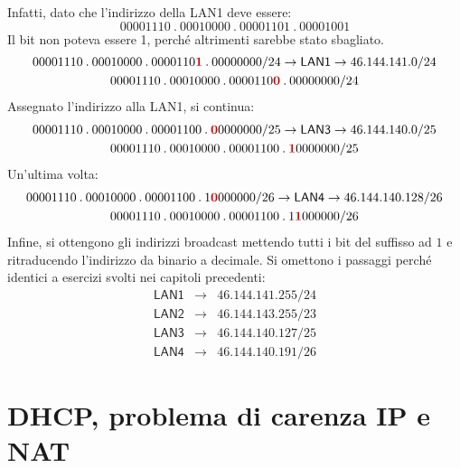 \documentclass[a4paper]{article}
\newcommand{\binaryaddresspointed}[4]{#1\:.\:#2\:.\:#3\:.\:#4}
\begin{document}
	Infatti, dato che l'indirizzo della \textsf{LAN1} deve essere:
	\begin{equation*}
		\binaryaddresspointed{00001110}{00010000}{00001101}{00001001}
	\end{equation*}
	Il bit non poteva essere 1, perché altrimenti sarebbe stato sbagliato.
	\begin{gather*}
		\binaryaddresspointed{00001110}{00010000}{0000110\textcolor{Red3}{\boldsymbol{1}}}{00000000}/24 \rightarrow \textsf{LAN1} \rightarrow 46.144.141.0/24 \\
		\binaryaddresspointed{00001110}{00010000}{0000110\textcolor{Red3}{\boldsymbol{0}}}{00000000}/24
	\end{gather*}
	Assegnato l'indirizzo alla \textsf{LAN1}, si continua:
	\begin{gather*}
		\binaryaddresspointed{00001110}{00010000}{00001100}{\textcolor{Red3}{\boldsymbol{0}}0000000}/25 \rightarrow \textsf{LAN3} \rightarrow 46.144.140.0/25 \\
		\binaryaddresspointed{00001110}{00010000}{00001100}{\textcolor{Red3}{\boldsymbol{1}}0000000}/25
	\end{gather*}
	Un'ultima volta:
	\begin{gather*}
		\binaryaddresspointed{00001110}{00010000}{00001100}{1\textcolor{Red3}{\boldsymbol{0}}000000}/26 \rightarrow \textsf{LAN4} \rightarrow 46.144.140.128/26 \\
		\binaryaddresspointed{00001110}{00010000}{00001100}{1\textcolor{Red3}{\boldsymbol{1}}000000}/26
	\end{gather*}
	Infine, si ottengono gli indirizzi broadcast mettendo tutti i bit del suffisso ad $1$ e ritraducendo l'indirizzo da binario a decimale. Si omettono i passaggi perché identici a esercizi svolti nei capitoli precedenti:
	\begin{equation*}
		\begin{array}{lll}
			\textsf{LAN1} & \longrightarrow & 46.144.141.255/24 \\
			\textsf{LAN2} & \longrightarrow & 46.144.143.255/23 \\
			\textsf{LAN3} & \longrightarrow & 46.144.140.127/25 \\
			\textsf{LAN4} & \longrightarrow & 46.144.140.191/26
		\end{array}
	\end{equation*}\newpage
	
	\section{DHCP, problema di carenza IP e NAT}\label{DHCP}
	
\end{document}
